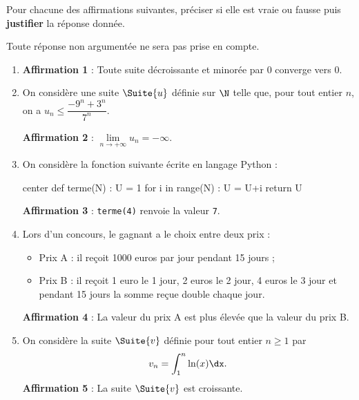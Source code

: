 Pour chacune des affirmations suivantes, préciser si elle est vraie ou fausse puis \textbf{justifier} la réponse donnée.

Toute réponse non argumentée ne sera pas prise en compte.

\begin{enumerate}
	\item \textbf{Affirmation 1} : Toute suite décroissante et minorée par 0 converge vers 0.
	\item On considère une suite $\Suite{u}$ définie sur $\N$ telle que, pour tout entier $n$, on a $u_n \leqslant \dfrac{-9^n+3^n}{7^n}$.
	
	\textbf{Affirmation 2} : $\lim\limits_{n \to +\infty} u_n = -\infty$.
	\item On considère la fonction suivante écrite en langage \textsf{Python} :
	
\begin{CodePythonLstAlt}[Largeur=10cm]{center}
def terme(N) :
	U = 1
	for i in range(N) :
		U = U+i
	return U
\end{CodePythonLstAlt}

	\textbf{Affirmation 3} : \texttt{terme(4)} renvoie la valeur \texttt{7}.
	\item Lors d’un concours, le gagnant a le choix entre deux prix :
	
	\begin{itemize}
		\item Prix A : il reçoit \num{1000} euros par jour pendant 15 jours ;
		\item Prix B : il reçoit 1 euro le 1 jour, 2 euros le 2 jour, 4 euros le 3 jour et pendant 15 jours la somme reçue double chaque jour.
	\end{itemize}
	
	\textbf{Affirmation 4} : La valeur du prix A est plus élevée que la valeur du prix B.
	\item On considère la suite $\Suite{v}$ définie pour tout entier $n \geqslant 1$ par \[ v_n = \int_{1}^{n} \ln(x)\dx. \]
	\textbf{Affirmation 5} : La suite $\Suite{v}$ est croissante.
\end{enumerate}
